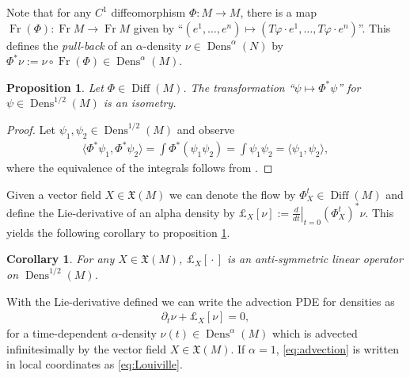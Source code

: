 \documentclass[letterpaper, 12 pt]{amsart}
\newtheorem{prop}[thm]{Proposition}
\newtheorem{cor}[thm]{Corollary}
\DeclareMathOperator{\Diff}{Diff}
\DeclareMathOperator{\Fr}{Fr}
\DeclareMathOperator{\Dens}{Dens}
\begin{document}
  Note that for any $C^1$ diffeomorphism $\Phi:M \to M$,
  there is a map $\Fr(\Phi) : \Fr M \to \Fr M$
  given by 
  ``$(e^1,\dots,e^n) \mapsto (T\varphi \cdot e^1, \dots, T\varphi \cdot e^n)$''.
  This defines the \emph{pull-back} of an $\alpha$-density
  $\nu \in \Dens^\alpha(N)$
  by $\Phi^* \nu := \nu \circ \Fr(\Phi) \in \Dens^\alpha(M)$.
  \begin{prop} \label{prop:isom}
    Let $\Phi \in \Diff(M)$.
    The transformation ``$\psi \mapsto \Phi^* \psi$'' for
    $\psi \in \Dens^{1/2}(M)$ is an isometry.
  \end{prop}
  \begin{proof}
    Let $\psi_1,\psi_2 \in \Dens^{1/2}(M)$ and observe
    \begin{align*}
      \langle \Phi^* \psi_1, \Phi^* \psi_2 \rangle
      = \int \Phi^*( \psi_1 \psi_2)
      = \int \psi_1 \psi_2
      = \langle \psi_1, \psi_2 \rangle,
    \end{align*}
    where the equivalence of the integrals follows
    from \cite[Proposition 14.32(c)]{Lee2006}.
  \end{proof}
  
  Given a vector field $X \in \mathfrak{X}(M)$
  we can denote the flow by $\Phi^t_X \in \Diff(M)$
  and define the Lie-derivative of an alpha density by
  $
    \pounds_X[ \nu ] := \left. \frac{d}{dt} \right|_{t=0} (\Phi_X^t)^* \nu.
  $
  This yields the following corollary to proposition \ref{prop:isom}.
  \begin{cor}
    For any $X \in \mathfrak{X}(M)$, $\pounds_X[ {}\cdot{} ]$
    is an anti-symmetric linear operator on $\Dens^{1/2}(M)$.
  \end{cor}
  With the Lie-derivative defined we can write the advection
  PDE for densities as
  \begin{align}
    \partial_t \nu + \pounds_X[\nu] = 0 \label{eq:advection},
  \end{align}
  for a time-dependent $\alpha$-density $\nu(t) \in \Dens^\alpha(M)$
  which is advected infinitesimally by the vector field 
  $X \in \mathfrak{X}(M)$.
  If $\alpha = 1$, \eqref{eq:advection} is written in local coordinates
  as \eqref{eq:Louiville}.
\end{document}
